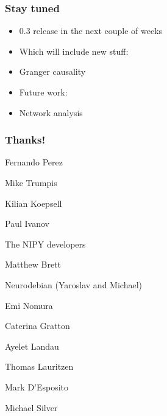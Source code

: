 \documentclass{beamer}
\begin{document}
\begin{frame}
\frametitle{Stay tuned}
\begin{itemize}

\pause
\item
0.3 release in the next couple of weeks

\pause
\item
Which will include new stuff: 

\pause
\item
Granger causality

\pause
\item
Future work: 

\pause
\item
Network analysis 

\end{itemize}
\end{frame}

\begin{frame}
\frametitle{Thanks!}
\pause
Fernando Perez

Mike Trumpis

Kilian Koepsell

Paul Ivanov

\pause
The NIPY developers

Matthew Brett 

\pause
Neurodebian (Yaroslav and Michael)

\pause
Emi Nomura 

Caterina Gratton 

Ayelet Landau 

Thomas Lauritzen

\pause
Mark D'Esposito 

Michael Silver
\end{frame}
\end{document}
